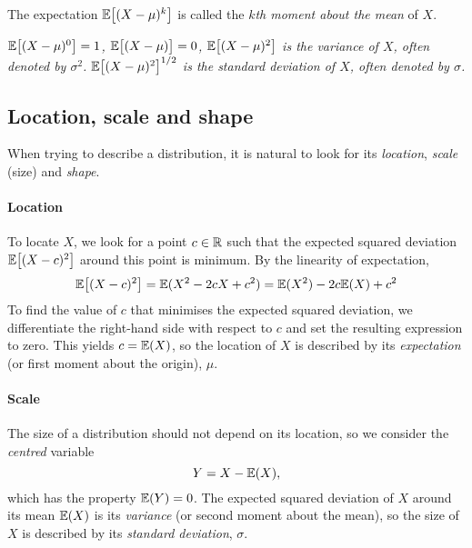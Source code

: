 \begin{definition}
The expectation $\mathbb{E}\big[(X-\mu)^{k}\big]$ is called the \emph{$k$th moment about the mean} of $X$.
\end{definition}

\bit
\it $\mathbb{E}\big[(X-\mu)^{0}\big] = 1$,
\it $\mathbb{E}\big[(X-\mu)\big] = 0$,
\it $\mathbb{E}\big[(X-\mu)^2\big]$ is the \emph{variance} of $X$, often denoted by $\sigma^2$.
\it $\mathbb{E}\big[(X-\mu)^2\big]^{1/2}$ is the \emph{standard deviation} of $X$, often denoted by $\sigma$.
\eit


\subsection{Location, scale and shape} 

When trying to describe a distribution, it is natural to look for its \emph{location}, \emph{scale} (size) and \emph{shape}.


\paragraph{Location}
To locate $X$, we look for a point $c\in\mathbb{R}$ such that the expected squared deviation $\mathbb{E}\big[(X-c)^2\big]$ around this point is minimum. By the linearity of expectation,
\[
\mathbb{E}\big[(X-c)^2\big] = \mathbb{E}(X^2 - 2cX + c^2) = \mathbb{E}(X^2) - 2c\mathbb{E}(X) + c^2
\]
To find the value of $c$ that minimises the expected squared deviation, we differentiate the right-hand side with respect to $c$ and set the resulting expression to zero. This yields $c=\mathbb{E}(X)$, so the location of $X$ is described by its \emph{expectation} (or first moment about the origin), $\mu$. 

\paragraph{Scale}
The size of a distribution should not depend on its location, so we consider the \emph{centred} variable 
\[
Y=X-\mathbb{E}(X),
\]
which has the property $\mathbb{E}(Y)=0$. The expected squared deviation of $X$ around its mean $\mathbb{E}(X)$ is its \emph{variance} (or second moment about the mean), so the size of $X$ is described by its \emph{standard deviation}, $\sigma$.

